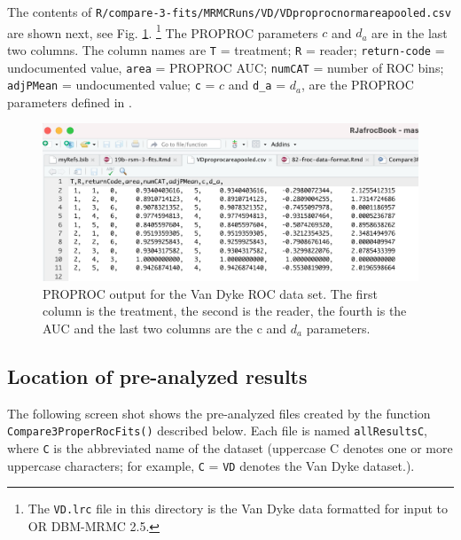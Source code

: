 \documentclass[
]{book}
\begin{document}
The contents of \texttt{R/compare-3-fits/MRMCRuns/VD/VDproprocnormareapooled.csv} are shown next, see Fig. \ref{fig:rsm-3-fits-proproc-output-van-dyke}. \footnote{The \texttt{VD.lrc} file in this directory is the Van Dyke data formatted for input to OR DBM-MRMC 2.5.} The PROPROC parameters \(c\) and \(d_a\) are in the last two columns. The column names are \texttt{T} = treatment; \texttt{R} = reader; \texttt{return-code} = undocumented value, \texttt{area} = PROPROC AUC; \texttt{numCAT} = number of ROC bins; \texttt{adjPMean} = undocumented value; \texttt{c} = \(c\) and \texttt{d\_a} = \(d_a\), are the PROPROC parameters defined in \citep{metz1999proper}.

\begin{figure}

{\centering \includegraphics[width=0.5\linewidth,height=0.2\textheight]{images/compare-3-fits/vanDyke} 

}

\caption{PROPROC output for the Van Dyke ROC data set. The first column is the treatment, the second is the reader, the fourth is the AUC and the last two columns are the c and $d_a$ parameters.}\label{fig:rsm-3-fits-proproc-output-van-dyke}
\end{figure}

\hypertarget{rsm-3-fits-pre-analyzed-results}{%
\subsection{Location of pre-analyzed results}\label{rsm-3-fits-pre-analyzed-results}}

The following screen shot shows the pre-analyzed files created by the function \texttt{Compare3ProperRocFits()} described below. Each file is named \texttt{allResultsC}, where \texttt{C} is the abbreviated name of the dataset (uppercase C denotes one or more uppercase characters; for example, \texttt{C} = \texttt{VD} denotes the Van Dyke dataset.).
\end{document}
